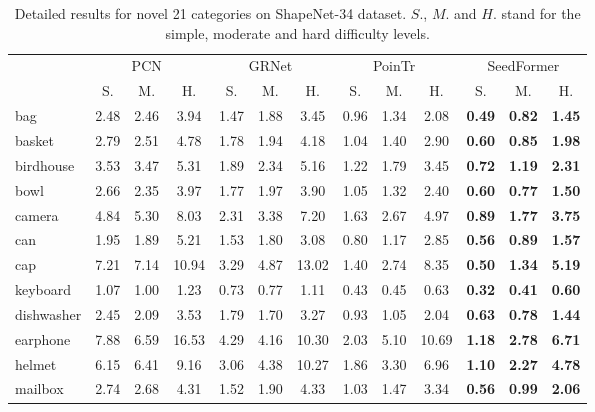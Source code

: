 \begin{table*}[t]
	\centering
\scriptsize
	\setlength{\tabcolsep}{4.5pt}
\caption{Detailed results for novel 21 categories on ShapeNet-34 dataset. $S.$, $M.$ and $H.$ stand for the simple, moderate and hard difficulty levels.}
	\vspace{5pt}
	\begin{tabular}{l|ccc|ccc|ccc|ccc}
		\toprule[1pt]
		& \multicolumn{3}{c|}{PCN~\cite{yuan2018pcn}} & \multicolumn{3}{c|}{GRNet~\cite{xie2020grnet}} & \multicolumn{3}{c|}{PoinTr~\cite{yu2021pointr}} & \multicolumn{3}{c}{SeedFormer} \\
		& S. & M. & H. & S. & M. & H. & S. & M. & H. & S. & M. & H.\\
		\midrule[0.3pt]
		bag			& 2.48 & 2.46 & 3.94 & 1.47 & 1.88 & 3.45 & 0.96 & 1.34 & 2.08 & \textbf{0.49} & \textbf{0.82} & \textbf{1.45} \\
		basket		& 2.79 & 2.51 & 4.78 & 1.78 & 1.94 & 4.18 & 1.04 & 1.40 & 2.90 & \textbf{0.60} & \textbf{0.85} & \textbf{1.98} \\
		birdhouse	& 3.53 & 3.47 & 5.31 & 1.89 & 2.34 & 5.16 & 1.22 & 1.79 & 3.45 & \textbf{0.72} & \textbf{1.19} & \textbf{2.31} \\
		bowl		& 2.66 & 2.35 & 3.97 & 1.77 & 1.97 & 3.90 & 1.05 & 1.32 & 2.40 & \textbf{0.60} & \textbf{0.77} & \textbf{1.50} \\
		camera		& 4.84 & 5.30 & 8.03 & 2.31 & 3.38 & 7.20 & 1.63 & 2.67 & 4.97 & \textbf{0.89} & \textbf{1.77} & \textbf{3.75} \\
		can			& 1.95 & 1.89 & 5.21 & 1.53 & 1.80 & 3.08 & 0.80 & 1.17 & 2.85 & \textbf{0.56} & \textbf{0.89} & \textbf{1.57} \\
		cap			& 7.21 & 7.14 & 10.94 & 3.29 & 4.87 & 13.02 & 1.40 & 2.74 & 8.35 & \textbf{0.50} & \textbf{1.34} & \textbf{5.19} \\
		keyboard	& 1.07 & 1.00 & 1.23 & 0.73 & 0.77 & 1.11 & 0.43 & 0.45 & 0.63 & \textbf{0.32} & \textbf{0.41} & \textbf{0.60} \\
		dishwasher	& 2.45 & 2.09 & 3.53 & 1.79 & 1.70 & 3.27 & 0.93 & 1.05 & 2.04 & \textbf{0.63} & \textbf{0.78} & \textbf{1.44} \\
		earphone	& 7.88 & 6.59 & 16.53 & 4.29 & 4.16 & 10.30 & 2.03 & 5.10 & 10.69 & \textbf{1.18} & \textbf{2.78} & \textbf{6.71} \\
		helmet		& 6.15 & 6.41 & 9.16 & 3.06 & 4.38 & 10.27 & 1.86 & 3.30 & 6.96 & \textbf{1.10} & \textbf{2.27} & \textbf{4.78} \\
		mailbox		& 2.74 & 2.68 & 4.31 & 1.52 & 1.90 & 4.33 & 1.03 & 1.47 & 3.34 & \textbf{0.56} & \textbf{0.99} & \textbf{2.06} \\

\end{tabular}
\end{table*}
